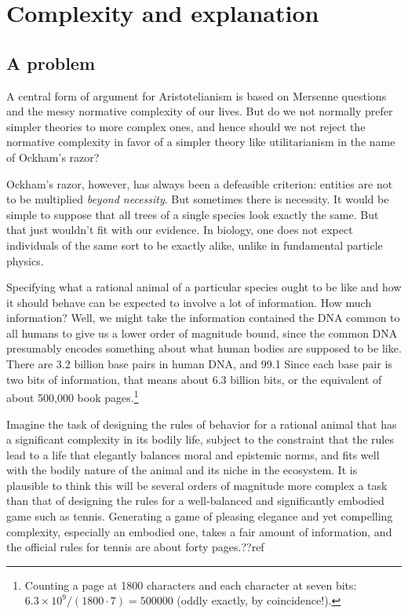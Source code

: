 \section{Complexity and explanation}\label{sec:hierarchy}
\subsection{A problem}
A central form of argument for Aristotelianism is based on Mersenne questions and the messy normative complexity of our
lives. But do we not normally prefer simpler theories to more complex ones, and hence should we not reject the normative
complexity in favor of a simpler theory like utilitarianism in the name of Ockham's razor?

Ockham's razor, however, has always been a defeasible criterion: entities are not to be multiplied \textit{beyond necessity}.
But sometimes there is necessity. It would be simple to suppose that all trees of a single species look exactly the same.
But that just wouldn't fit with our evidence. In biology, one does not expect individuals of the same sort to be exactly
alike, unlike in fundamental particle physics. 

Specifying what a rational animal of a particular species ought to be like
and how it should behave can be expected to involve a lot of information. How much information? Well, we might take the information contained
the DNA common to all humans to give us a lower order of magnitude bound, since the common DNA presumably encodes something
about what human bodies are supposed to be like. There are 3.2 billion base pairs in human DNA, and 
99.1%
Since each base pair is two bits of information, that means about 6.3 billion bits, or the equivalent of about 500,000
book pages.\footnote{Counting a page at 1800 characters and each character at seven bits: $6.3\times 10^9/(1800\cdot 7)=500000$
(oddly exactly, by coincidence!).} 

Imagine the task of designing the rules of behavior for a rational animal that has a significant complexity in its bodily
life, subject to the constraint that the rules lead to a life that elegantly balances moral and epistemic norms, and fits
well with the bodily nature of the animal and its niche in the ecosystem. It is plausible to think this will be several
orders of magnitude more complex a task than that of designing the rules for a well-balanced and significantly embodied game 
such as tennis. Generating a game of pleasing elegance and yet compelling complexity, especially an embodied one, takes a 
fair amount of information, and the official rules for tennis are about forty pages.??ref 

